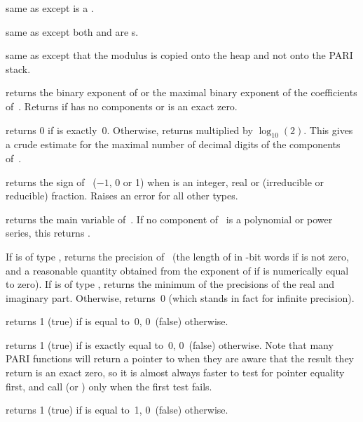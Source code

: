  same as  except  is a
.

 same as  except both 
and  are s.

 same as  except that the
modulus  is copied onto the heap and not onto the PARI stack.

 returns the binary exponent of  or the maximal
binary exponent of the coefficients of~. Returns
\hbox{} if  has no components or is an exact zero.

 returns 0 if  is exactly~0. Otherwise,
returns  multiplied by $\log_{10}(2)$. This gives a
crude estimate for the maximal number of decimal digits of the components
of~.

 returns the sign of~ ($-1$, 0 or 1) when
 is an integer, real or (irreducible or reducible) fraction. Raises
an error for all other types.

 returns the main variable of~. If no component
of~ is a polynomial or power series, this returns .

 If  is of type , returns the
precision of~ (the length of  in \B-bit words if  is
not zero, and a reasonable quantity obtained from the exponent of 
if  is numerically equal to zero). If  is of type ,
returns the minimum of the precisions of the real and imaginary part.
Otherwise, returns~0 (which stands in fact for infinite precision).


 returns 1 (true) if  is equal to~0, 0~(false)
otherwise.

 returns 1 (true) if  is exactly equal
to~0, 0~(false) otherwise. Note that many PARI functions will return a
pointer to  when they are aware that the result they return is
an exact zero, so it is almost always faster to test for pointer equality
first, and call  (or ) only when the first
test fails.

 returns 1 (true) if  is equal to~1, 0~(false)
otherwise.

